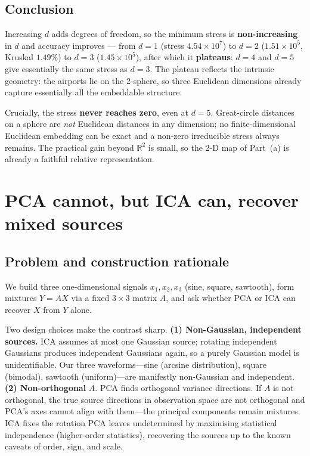 \documentclass[10pt,a4paper]{article}
\begin{document}
\subsection{Conclusion}

Increasing $d$ adds degrees of freedom, so the minimum stress is \textbf{non-increasing} in $d$ and accuracy improves --- from $d=1$ (stress $4.54\times10^7$) to $d=2$ ($1.51\times10^5$, Kruskal $1.49\%$) to $d=3$ ($1.45\times10^5$), after which it \textbf{plateaus}: $d=4$ and $d=5$ give essentially the same stress as $d=3$. The plateau reflects the intrinsic geometry: the airports lie on the 2-sphere, so three Euclidean dimensions already capture essentially all the embeddable structure.

Crucially, the stress \textbf{never reaches zero}, even at $d=5$. Great-circle distances on a sphere are \emph{not} Euclidean distances in any dimension; no finite-dimensional Euclidean embedding can be exact and a non-zero irreducible stress always remains. The practical gain beyond $\mathbb{R}^2$ is small, so the 2-D map of Part~(a) is already a faithful relative representation.

\section{PCA cannot, but ICA can, recover mixed sources}

\subsection{Problem and construction rationale}

We build three one-dimensional signals $x_1,x_2,x_3$ (sine, square, sawtooth), form mixtures
$Y=AX$ via a fixed $3\times3$ matrix $A$, and ask whether PCA or ICA can recover $X$ from $Y$ alone.

Two design choices make the contrast sharp. \textbf{(1) Non-Gaussian, independent sources.}
ICA assumes at most one Gaussian source; rotating independent Gaussians produces independent
Gaussians again, so a purely Gaussian model is unidentifiable. Our three waveforms---sine (arcsine
distribution), square (bimodal), sawtooth (uniform)---are manifestly non-Gaussian and
independent. \textbf{(2) Non-orthogonal} $A$. PCA finds orthogonal variance directions. If $A$ is
not orthogonal, the true source directions in observation space are not orthogonal and PCA's axes
cannot align with them---the principal components remain mixtures. ICA fixes the rotation PCA
leaves undetermined by maximising statistical independence (higher-order statistics), recovering
the sources up to the known caveats of order, sign, and scale.
\end{document}
